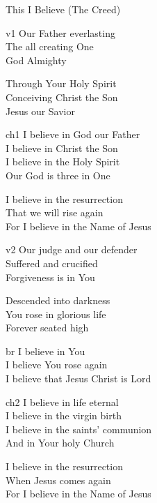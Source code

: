 \begin{song}{This I Believe (The Creed)}


    \begin{songframe}{v1}
        Our Father everlasting \\
        The all creating One \\
        God Almighty  
        
        Through Your Holy Spirit \\
        Conceiving Christ the Son \\
        Jesus our Savior
    \end{songframe}

    \begin{songframe}{ch1}
        I believe in God our Father \\
        I believe in Christ the Son \\
        I believe in the Holy Spirit \\
        Our God is three in One
        
        I believe in the resurrection \\
        That we will rise again \\
        For I believe in the Name of Jesus
    \end{songframe}

    \begin{songframe}{v2}
        Our judge and our defender \\
        Suffered and crucified \\
        Forgiveness is in You
        
        Descended into darkness \\
        You rose in glorious life \\
        Forever seated high
    \end{songframe}

    \begin{songframe}{br}
        I believe in You \\
        I believe You rose again \\
        I believe that Jesus Christ is Lord
    \end{songframe}

    \begin{songframe}{ch2}
        I believe in life eternal \\
        I believe in the virgin birth \\
        I believe in the saints' communion \\
        And in Your holy Church
        
        I believe in the resurrection \\
        When Jesus comes again \\
        For I believe in the Name of Jesus
    \end{songframe} 


\end{song}
\endinput
